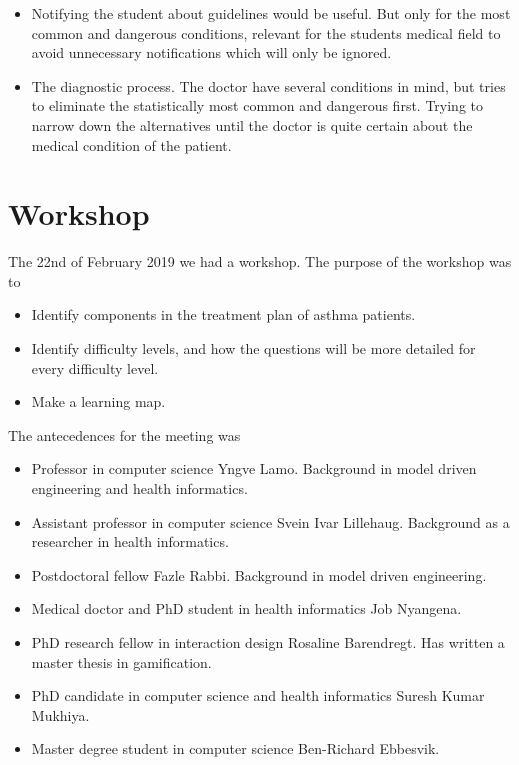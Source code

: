 \begin{itemize}
	\item Notifying the student about guidelines would be useful. But only for the most common and dangerous conditions, relevant for the students medical field to avoid unnecessary notifications which will only be ignored.
\item The diagnostic process. The doctor have several conditions in mind, but tries to eliminate the statistically most common and dangerous first. Trying to narrow down the alternatives until the doctor is quite certain about the medical condition of the patient.
	
\end{itemize}


\section{Workshop}
The 22nd of February 2019 we had a workshop. The purpose of the workshop was to
\begin{itemize}
	\item Identify components in the treatment plan of asthma patients.
	\item Identify difficulty levels, and how the questions will be more detailed for every difficulty level.
	\item Make a learning map.
\end{itemize}

The antecedences for the meeting was 
\begin{itemize}
	\item Professor in computer science Yngve Lamo. Background in model driven engineering and health informatics.
	\item Assistant professor in computer science Svein Ivar Lillehaug. Background as a researcher in health informatics.
	\item Postdoctoral fellow Fazle Rabbi. Background in model driven engineering.
	\item Medical doctor and PhD student in health informatics Job Nyangena.
	\item PhD research fellow in interaction design Rosaline Barendregt. Has written a master thesis in gamification.
	\item PhD candidate in computer science and health informatics Suresh Kumar Mukhiya.
	\item Master degree student in computer science Ben-Richard Ebbesvik.	
\end{itemize}

